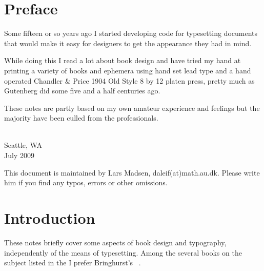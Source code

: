 \documentclass[10pt,letterpaper,extrafontsizes]{memoir}
\begin{document}


\tableofcontents

\endgroup




\setlength{\unitlength}{1pt}
\clearpage 
\listoffigures
\clearpage
\listoftables
\clearpage

\chapter{Preface}

    Some fifteen or so years ago I started developing code for typesetting
documents that would make it easy for designers to get the appearance
they had in mind.


   While doing this I read a lot about book design and have tried my hand
at printing a variety of books and ephemera using hand set lead type 
and a hand operated Chandler \& Price 1904 Old Style 8 by 12 platen
press, pretty much as Gutenberg did some five and a half centuries ago.

   These notes are partly based on my own amateur
experience and feelings but the majority have been culled from the
professionals.

{ \\ Seattle, WA \\ July 2009\par}


\vskip 3cm

\noindent
This document is maintained by Lars Madsen,
daleif(at)math.au.dk. Please write him if you find any typos, errors or
other omissions.








\chapter{Introduction}

    These notes briefly cover some aspects of book design and typography, 
independently of the means of typesetting. Among
the several books on the subject listed in the \bibname{} I prefer
Bringhurst's ~\autocite{BRINGHURST99}.
\end{document}
